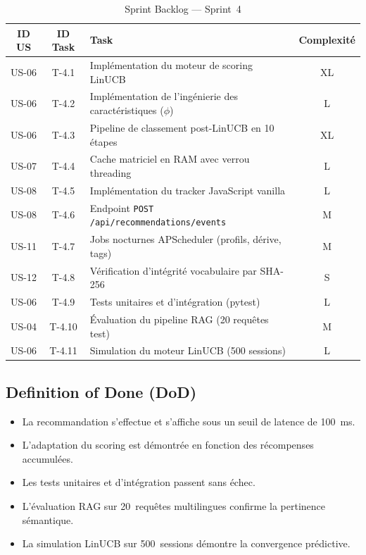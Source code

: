 \begin{table}[H]
    \centering
    \caption{Sprint Backlog --- Sprint~4}
    \label{tab:sprint4_backlog}
    \small
    \begin{tabular}{c c p{6.5cm} c}
        \toprule
        \textbf{ID US} & \textbf{ID Task} & \textbf{Task} & \textbf{Complexité} \\
        \midrule
        US-06 & T-4.1 & Implémentation du moteur de scoring LinUCB & XL \\[3pt]
        US-06 & T-4.2 & Implémentation de l'ingénierie des caractéristiques ($\phi$) & L \\[3pt]
        US-06 & T-4.3 & Pipeline de classement post-LinUCB en 10 étapes & XL \\[3pt]
        US-07 & T-4.4 & Cache matriciel en RAM avec verrou threading & L \\[3pt]
        US-08 & T-4.5 & Implémentation du tracker JavaScript vanilla & L \\[3pt]
        US-08 & T-4.6 & Endpoint \texttt{POST /api/recommendations/events} & M \\[3pt]
        US-11 & T-4.7 & Jobs nocturnes APScheduler (profils, dérive, tags) & M \\[3pt]
        US-12 & T-4.8 & Vérification d'intégrité vocabulaire par SHA-256 & S \\[3pt]
        US-06 & T-4.9 & Tests unitaires et d'intégration (pytest) & L \\[3pt]
        US-04 & T-4.10 & Évaluation du pipeline RAG (20 requêtes test) & M \\[3pt]
        US-06 & T-4.11 & Simulation du moteur LinUCB (500 sessions) & L \\
        \bottomrule
    \end{tabular}
\end{table}

\subsection{Definition of Done (DoD)}

\begin{itemize}
    \item La recommandation s'effectue et s'affiche sous un seuil de latence de 100~ms.
    \item L'adaptation du scoring est démontrée en fonction des récompenses accumulées.
    \item Les tests unitaires et d'intégration passent sans échec.
    \item L'évaluation RAG sur 20~requêtes multilingues confirme la pertinence sémantique.
    \item La simulation LinUCB sur 500~sessions démontre la convergence prédictive.
\end{itemize}


